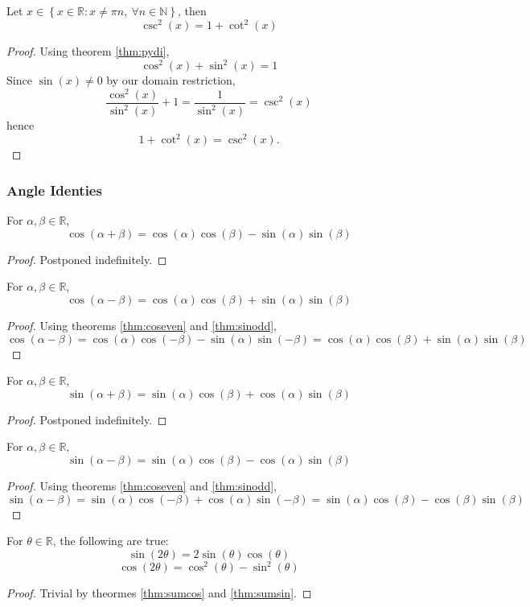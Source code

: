\documentclass[11pt]{article}
\numberwithin{lemma}{section}
\numberwithin{equation}{section}
\numberwithin{define}{section}
\numberwithin{prop}{section}
\numberwithin{figure}{section}
\numberwithin{theorem}{section}
\numberwithin{cor}{section}
\numberwithin{ex}{section}
\def\real{\mathbb{R}}
\def\nat{\mathbb{N}}
\def\cbrak#1{\left\{#1\right\}}
\begin{document}
\begin{cor}
	Let $x\in \cbrak{x\in\real: x\neq \pi n, \:
\forall n\in\nat}$, then
$$\csc^2(x)=1+\cot^2(x)$$
\end{cor}
\begin{proof}
	Using theorem \eqref{thm:pydi},
	$$\cos^2(x)+\sin^2(x)=1$$
	Since $\sin(x)\neq0$ by our domain restriction,
	$$\frac{\cos^2(x)}{\sin^2(x)}+1=\frac{1}{\sin^2(x)}=\csc^2(x)$$
	hence
	$$1+\cot^2(x)=\csc^2(x).$$
\end{proof}

\subsubsection{Angle Identies}
\begin{theorem}
\label{thm:sumcos}
For $\alpha,\beta\in\real$,
$$\cos(\alpha+\beta)=\cos(\alpha)\cos(\beta)-\sin(\alpha)\sin(\beta)$$
\end{theorem}
\begin{proof}
	Postponed indefinitely.
\end{proof}
\begin{cor}
	For $\alpha,\beta\in\real$,
$$\cos(\alpha-\beta)=\cos(\alpha)\cos(\beta)+\sin(\alpha)\sin(\beta)$$
\end{cor}
\begin{proof}
	Using theorems \eqref{thm:coseven} and \eqref{thm:sinodd},
	$$\cos(\alpha-\beta)=
	\cos(\alpha)\cos(-\beta)-\sin(\alpha)\sin(-\beta)=
	\cos(\alpha)\cos(\beta)+\sin(\alpha)\sin(\beta)$$
\end{proof}

\begin{theorem}
\label{thm:sumsin}
For $\alpha,\beta\in\real$,
$$\sin(\alpha+\beta)=\sin(\alpha)\cos(\beta)+\cos(\alpha)\sin(\beta)$$
\end{theorem}
\begin{proof}
	Postponed indefinitely.
\end{proof}

\begin{cor}
	For $\alpha,\beta\in\real$,
$$\sin(\alpha-\beta)=\sin(\alpha)\cos(\beta)-\cos(\alpha)\sin(\beta)$$
\end{cor}
\begin{proof}
	Using theorems \eqref{thm:coseven} and \eqref{thm:sinodd},
	$$\sin(\alpha-\beta)=\sin(\alpha)\cos(-\beta)+\cos(\alpha)\sin(-\beta)
	=\sin(\alpha)\cos(\beta)-\cos(\beta)\sin(\beta)$$
\end{proof}

\begin{cor}
	For $\theta\in\real$, the following are true:
	$$\sin(2\theta)=2\sin(\theta)\cos(\theta)$$
	$$\cos(2\theta)=\cos^2(\theta)-\sin^2(\theta)$$
	\label{cor:doubleangle}
\end{cor}
\begin{proof}
	Trivial by theormes \eqref{thm:sumcos} and \eqref{thm:sumsin}.
\end{proof}
\end{document}
